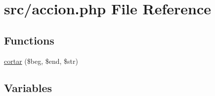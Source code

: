 \hypertarget{accion_8php}{\section{src/accion.php File Reference}
\label{accion_8php}
}
\subsection*{Functions}
\begin{DoxyCompactItemize}
\item 
\hyperlink{accion_8php_ad12e25311a559d701c21fcfff6fdc5d2}{cortar} (\$beg, \$end, \$str)
\end{DoxyCompactItemize}
\subsection*{Variables}

